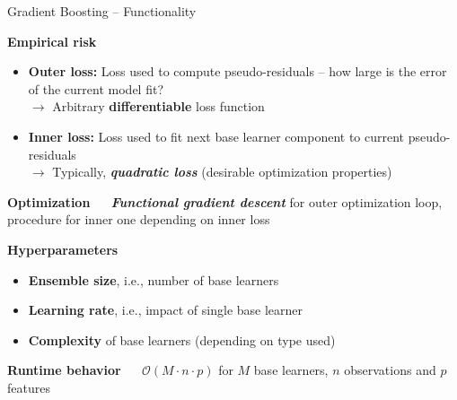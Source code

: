 \documentclass[11pt,compress,t,notes=noshow, xcolor=table]{beamer}
\newcommand{\bfit}[1]{\textbf{\textit{#1}}}
\newcommand{\highlight}[1]{\textcolor{highlightcol}{\textbf{#1}}}
\begin{document}
\begin{frame}{Gradient Boosting -- Functionality}

\footnotesize

\highlight{Empirical risk}

\begin{itemize}
  \item \textbf{Outer loss:} Loss used to compute pseudo-residuals -- how large 
  is the error of the current model fit? \\
  $\rightarrow$ Arbitrary \textbf{differentiable} loss function
  \item \textbf{Inner loss:} Loss used to fit next base learner component to 
  current pseudo-residuals \\
  $\rightarrow$ Typically, \bfit{quadratic loss} (desirable 
  optimization properties)
\end{itemize}

\medskip

\highlight{Optimization} ~~ \bfit{Functional gradient descent} for outer 
optimization loop, procedure for inner one depending on inner loss

\medskip

\highlight{Hyperparameters}

\begin{itemize}
  \item \textbf{Ensemble size}, i.e., number of base learners
  \item \textbf{Learning rate}, i.e., impact of single base learner
  \item \textbf{Complexity} of base learners (depending on type used)
\end{itemize}

\medskip

\highlight{Runtime behavior} ~~ $\mathcal{O}(M \cdot n \cdot p)$ 
for $M$ base learners, $n$ observations and $p$ features

\end{frame}

\end{document}
